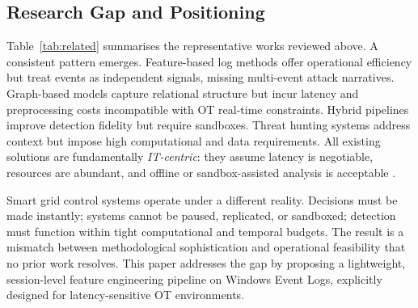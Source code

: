 \subsection{Research Gap and Positioning}

Table~\ref{tab:related} summarises the representative works reviewed above. A consistent
pattern emerges. Feature-based log methods \cite{achmad2025,onal2025} offer operational
efficiency but treat events as independent signals, missing multi-event attack narratives.
Graph-based models \cite{zhen2025,han2020} capture relational structure but incur latency
and preprocessing costs incompatible with OT real-time constraints. Hybrid pipelines
\cite{ayub2023,anderson2018} improve detection fidelity but require sandboxes. Threat
hunting systems \cite{chen2022} address context but impose high computational and data
requirements. All existing solutions are fundamentally \emph{IT-centric}: they assume
latency is negotiable, resources are abundant, and offline or sandbox-assisted analysis
is acceptable \cite{nafees2023}.

Smart grid control systems operate under a different reality. Decisions must be made
instantly; systems cannot be paused, replicated, or sandboxed; detection must function
within tight computational and temporal budgets. The result is a mismatch between
methodological sophistication and operational feasibility that no prior work resolves.
This paper addresses the gap by proposing a lightweight, session-level feature engineering
pipeline on Windows Event Logs, explicitly designed for latency-sensitive OT environments.

